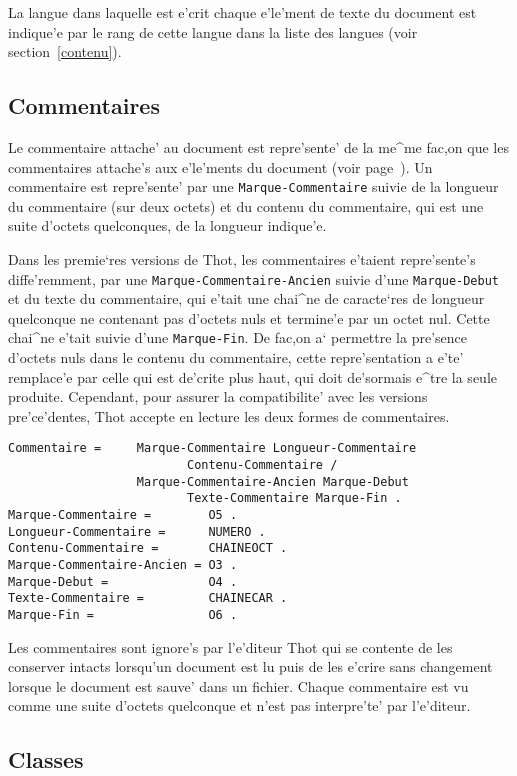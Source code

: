 La langue dans laquelle est e'crit chaque e'le'ment de texte du document est
indique'e par le rang de cette langue dans la liste des langues (voir
section~\ref{contenu}).

\subsection{Commentaires}
\label{comment}

Le commentaire attache' au document est repre'sente' de la me^me fac,on que
les commentaires attache's aux e'le'ments du document (voir page~\pageref{prescom}).
Un commentaire est repre'sente' par une {\tt Marque-Commentaire} suivie de la
longueur du commentaire (sur deux octets) et du contenu du commentaire,
qui est une suite d'octets quelconques, de la longueur indique'e.

Dans les premie`res versions de Thot, les commentaires e'taient repre'sente's
diffe'remment, par une {\tt Marque-Commentaire-Ancien} suivie d'une
{\tt Marque-Debut} et du texte du commentaire, qui e'tait une chai^ne
de caracte`res de longueur quelconque ne contenant pas d'octets nuls et
termine'e par un octet nul. Cette chai^ne e'tait suivie d'une
{\tt Marque-Fin}. De fac,on a` permettre la pre'sence d'octets nuls dans le
contenu du commentaire, cette repre'sentation a e'te' remplace'e par celle
qui est de'crite plus haut, qui doit de'sormais e^tre la seule produite.
Cependant, pour assurer la compatibilite' avec les versions pre'ce'dentes,
Thot accepte en lecture les deux formes de commentaires.

\begin{verbatim}
Commentaire =     Marque-Commentaire Longueur-Commentaire
                         Contenu-Commentaire /
                  Marque-Commentaire-Ancien Marque-Debut
                         Texte-Commentaire Marque-Fin .
Marque-Commentaire =        O5 .
Longueur-Commentaire =      NUMERO .
Contenu-Commentaire =       CHAINEOCT .
Marque-Commentaire-Ancien = O3 .
Marque-Debut =              O4 .
Texte-Commentaire =         CHAINECAR .
Marque-Fin =                O6 .
\end{verbatim}

Les commentaires sont ignore's par l'e'diteur Thot qui se contente de les
conserver intacts lorsqu'un document est lu puis de les e'crire sans
changement lorsque le document est sauve' dans un fichier. Chaque commentaire
est vu comme une suite d'octets quelconque et n'est pas interpre'te' par
l'e'diteur.

\subsection{Classes}

